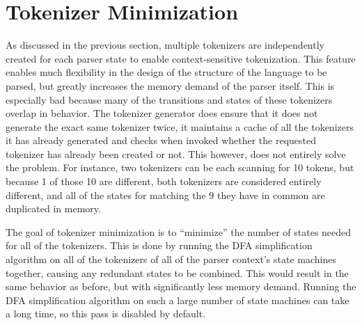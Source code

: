 
\section{Tokenizer Minimization}
{
	As discussed in the previous section,
	multiple tokenizers are independently created for
	each parser state to enable context-sensitive tokenization.
	This feature enables much flexibility in the design of the structure
	of the language to be parsed, but greatly increases the memory demand
	of the parser itself. This is especially bad because many
	of the transitions
	and states of these tokenizers overlap in behavior.
	The tokenizer generator does ensure that it does not generate the
	exact same tokenizer twice, it maintains a cache of all the tokenizers
	it has already generated and checks when invoked whether the requested
	tokenizer has already been created or not.
	This however, does not entirely solve the problem.
	For instance, two tokenizers can be each scanning for 10 tokens, but
	because 1 of those 10 are different, both tokenizers are considered
	entirely different, and all of the states for matching the 9 they have
	in common are duplicated in memory.
	
	The goal of tokenizer minimization is to ``minimize'' the number of
	states needed for all of the tokenizers. This is done by running
	the DFA simplification algorithm on all of the tokenizers of all of the
	parser context's state machines together,
	causing any redundant states to be combined. This would result
	in the same behavior as before, but with significantly less memory demand.
	Running the DFA simplification algorithm on such a large number
	of state machines can take a long time, so this pass is disabled by
	default.
}
